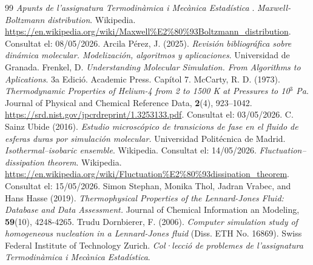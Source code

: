 \documentclass[a4paper,10.5pt]{report}
\begin{document}
\begin{thebibliography}{99}
\textit{Apunts de l'assignatura Termodinàmica i Mecànica Estadística
}.
\textit{Maxwell-Boltzmann distribution}. Wikipedia. \url{https://en.wikipedia.org/wiki/Maxwell%E2%80%93Boltzmann_distribution}. Consultat el: 08/05/2026.
Arcila Pérez, J. (2025). \textit{Revisión bibliográfica sobre dinámica molecular. Modelización, algoritmos y aplicaciones}. Universidad de Granada.
Frenkel, D. \textit{Understanding Molecular Simulation. From Algorithms to Aplications}. 3a Edició. Academic Press. Capítol 7.
McCarty, R. D. (1973). \textit{Thermodynamic Properties of Helium-4 from 2 to 1500 K at Pressures to 10$^3$ Pa}. Journal of Physical and Chemical Reference Data, \textbf{2}(4), 923–1042. \url{https://srd.nist.gov/jpcrdreprint/1.3253133.pdf}. Consultat el: 03/05/2026.
C. Sainz Ubide (2016). \textit{Estudio microscópico de transicions de fase en el fluido de esferas duras por simulación molecular.} Universidad Politécnica de Madrid.
\textit{Isothermal–isobaric ensemble}. Wikipedia. Consultat el: 14/05/2026.
\textit{Fluctuation–dissipation theorem}. Wikipedia. \url{https://en.wikipedia.org/wiki/Fluctuation%E2%80%93dissipation_theorem}. Consultat el: 15/05/2026.
Simon Stephan, Monika Thol, Jadran Vrabec, and Hans Hasse (2019). \textit{Thermophysical Properties of the Lennard-Jones Fluid: Database and Data Assessment.} Journal of Chemical Information an Modeling, \textbf{59}(10), 4248-4265.
Trudu Dornbierer, F. (2006). \textit{Computer simulation study of homogeneous nucleation in a Lennard-Jones fluid} (Diss. ETH No. 16869). Swiss Federal Institute of Technology Zurich.
\textit{Col·lecció de problemes de l'assignatura Termodinàmica i Mecànica Estadística}.
\end{thebibliography}

\newpage
\end{document}

